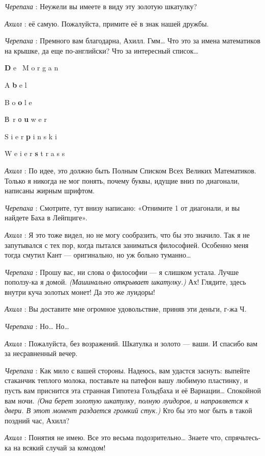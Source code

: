 \documentclass[../main.tex]{subfiles}
\begin{document}
\begin{dialogue}
\emph{Черепаха} : Неужели вы имеете в виду эту золотую шкатулку?

\emph{Ахилл} : её самую. Пожалуйста, примите её в знак нашей дружбы.

\emph{Черепаха} : Премного вам благодарна, Ахилл. Гмм\ldots{} Что это за имена математиков на крышке, да еще по-английски? Что за интересный список\ldots{}

\textbf{D} e ~M o r g a n

A \textbf{b} e l

B o \textbf{o} l e

В~r о \textbf{u} w e r

S i e r \textbf{p} i n s k i

W e i e r \textbf{s} t r a s s

\emph{Ахилл} : По идее, это должно быть Полным Списком Всех Великих Математиков. Только я никогда не мог понять, почему буквы, идущие вниз по диагонали, написаны жирным шрифтом.

\emph{Черепаха} : Смотрите, тут внизу написано: «Отнимите 1 от диагонали, и вы найдете Баха в Лейпциге».

\emph{Ахилл} : Я это тоже видел, но не могу сообразить, что бы это значило. Так я не запутывался с тех пор, когда пытался заниматься философией. Особенно меня тогда смутил Кант --- оригинально, но уж больно туманно\ldots{}

\emph{Черепаха} : Прошу вас, ни слова о философии --- я слишком устала. Лучше поползу-ка я домой. \emph{(Машинально открывает шкатулку.)} Ах! Глядите, здесь внутри куча золотых монет! Да это же луидоры!

\emph{Ахилл} : Вы доставите мне огромное удовольствие, приняв эти деньги, г-жа Ч.

\emph{Черепаха} : Но\ldots{} Но\ldots{}

\emph{Ахилл} : Пожалуйста, без возражений. Шкатулка и золото --- ваши. И спасибо вам за несравненный вечер.

\emph{Черепаха} : Как мило с вашей стороны. Надеюсь, вам удастся заснуть: выпейте стаканчик теплого молока, поставьте на патефон вашу любимую пластинку, и пусть вам приснится эта странная Гипотеза Гольдбаха и её Вариации\ldots{} Спокойной вам ночи. \emph{(Она берет золотую шкатулку, полную луидоров, и направляется к двери. В этот момент раздается громкий стук.)} Кто бы это мог быть в такой поздний час, Ахилл?

\emph{Ахилл} : Понятия не имею. Все это весьма подозрительно\ldots{} Знаете что, спрячьтесь-ка на всякий случай за комодом!


\end{dialogue}
\end{document}
